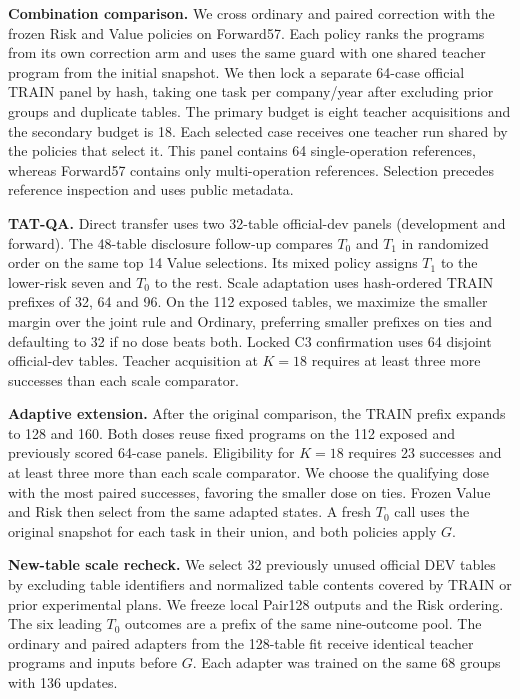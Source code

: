 \documentclass[10pt,letterpaper,conference]{IEEEtran}
\begin{document}
\textbf{Combination comparison.} We cross ordinary and paired correction with the frozen Risk and Value policies on Forward57. Each policy ranks the programs from its own correction arm and uses the same guard with one shared teacher program from the initial snapshot. We then lock a separate 64-case official TRAIN panel by hash, taking one task per company/year after excluding prior groups and duplicate tables. The primary budget is eight teacher acquisitions and the secondary budget is 18. Each selected case receives one teacher run shared by the policies that select it. This panel contains 64 single-operation references, whereas Forward57 contains only multi-operation references. Selection precedes reference inspection and uses public metadata.

\textbf{TAT-QA.} Direct transfer uses two 32-table official-dev panels (development and forward). The 48-table disclosure follow-up compares \(T_0\) and \(T_1\) in randomized order on the same top 14 Value selections. Its mixed policy assigns \(T_1\) to the lower-risk seven and \(T_0\) to the rest. Scale adaptation uses hash-ordered TRAIN prefixes of 32, 64 and 96. On the 112 exposed tables, we maximize the smaller margin over the joint rule and Ordinary, preferring smaller prefixes on ties and defaulting to 32 if no dose beats both. Locked C3 confirmation uses 64 disjoint official-dev tables. Teacher acquisition at \(K=18\) requires at least three more successes than each scale comparator.

\textbf{Adaptive extension.} After the original comparison, the TRAIN prefix expands to 128 and 160. Both doses reuse fixed programs on the 112 exposed and previously scored 64-case panels. Eligibility for \(K=18\) requires 23 successes and at least three more than each scale comparator. We choose the qualifying dose with the most paired successes, favoring the smaller dose on ties. Frozen Value and Risk then select from the same adapted states. A fresh \(T_0\) call uses the original snapshot for each task in their union, and both policies apply \(G\).

\textbf{New-table scale recheck.} We select 32 previously unused official DEV tables by excluding table identifiers and normalized table contents covered by TRAIN or prior experimental plans. We freeze local Pair128 outputs and the Risk ordering. The six leading \(T_0\) outcomes are a prefix of the same nine-outcome pool. The ordinary and paired adapters from the 128-table fit receive identical teacher programs and inputs before \(G\). Each adapter was trained on the same 68 groups with 136 updates.
\end{document}
